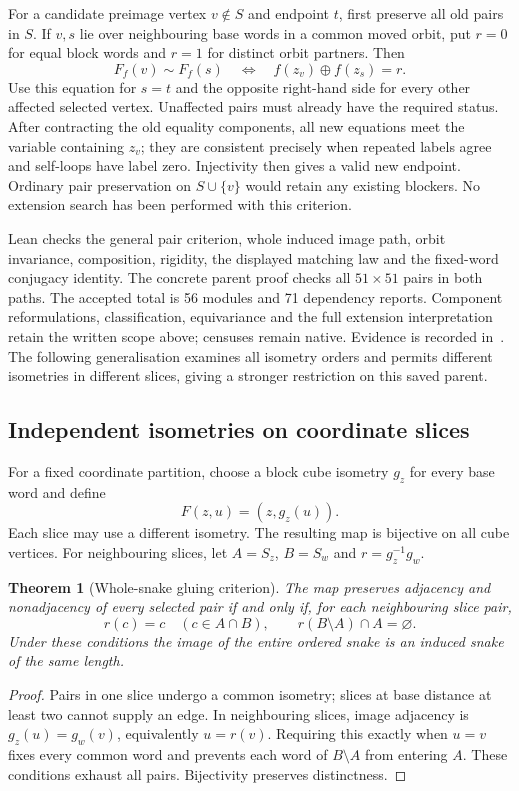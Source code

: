 \documentclass[11pt,a4paper]{article}
\newtheorem{theorem}{Theorem}[section]
\theoremstyle{definition}
\theoremstyle{remark}
\begin{document}
For a candidate preimage vertex $v\notin S$ and endpoint $t$, first
preserve all old pairs in $S$. If $v,s$ lie over neighbouring base
words in a common moved orbit, put $r=0$ for equal block words and
$r=1$ for distinct orbit partners. Then
\[
F_f(v)\sim F_f(s)\quad\Longleftrightarrow\quad
f(z_v)\oplus f(z_s)=r.
\]
Use this equation for $s=t$ and the opposite right-hand side for every
other affected selected vertex. Unaffected pairs must already have
the required status. After contracting the old equality components,
all new equations meet the variable containing $z_v$; they are
consistent precisely when repeated labels agree and self-loops have
label zero. Injectivity then gives a valid new endpoint. Ordinary
pair preservation on $S\cup\{v\}$ would retain any existing blockers.
No extension search has been performed with this criterion.

Lean checks the general pair criterion, whole induced image path,
orbit invariance, composition, rigidity, the displayed matching law
and the fixed-word conjugacy identity. The concrete parent proof
checks all $51\times51$ pairs in both paths. The accepted total is
56 modules and 71 dependency reports. Component reformulations,
classification, equivariance and the full extension interpretation
retain the written scope above; censuses remain native. Evidence is
recorded in~\cite{research203}. The following generalisation examines
all isometry orders and permits different isometries in different
slices, giving a stronger restriction on this saved parent.

\subsection{Independent isometries on coordinate slices}
\label{sec:slices204}
For a fixed coordinate partition, choose a block cube isometry $g_z$
for every base word and define
\[
F(z,u)=(z,g_z(u)).
\]
Each slice may use a different isometry. The resulting map is bijective
on all cube vertices. For neighbouring slices, let $A=S_z$, $B=S_w$
and $r=g_z^{-1}g_w$.

\begin{theorem}[Whole-snake gluing criterion]
\label{thm:slices204}
The map preserves adjacency and nonadjacency of every selected pair
if and only if, for each neighbouring slice pair,
\[
r(c)=c\quad(c\in A\cap B),\qquad
r(B\setminus A)\cap A=\varnothing.
\]
Under these conditions the image of the entire ordered snake is
an induced snake of the same length.
\end{theorem}
\begin{proof}
Pairs in one slice undergo a common isometry; slices at base distance
at least two cannot supply an edge. In neighbouring slices, image
adjacency is $g_z(u)=g_w(v)$, equivalently $u=r(v)$. Requiring this
exactly when $u=v$ fixes every common word and prevents each word of
$B\setminus A$ from entering $A$. These conditions exhaust all pairs.
Bijectivity preserves distinctness.
\end{proof}
\end{document}
